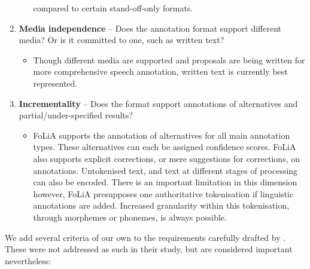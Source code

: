 \documentclass[a4paper,10pt,twoside]{article}
\begin{document}
\begin{enumerate}
\begin{itemize}
      compared to certain stand-off-only formats. 
  \end{itemize}
\item \textbf{Media independence} -- Does the annotation format support
  different media? Or is it committed to one, such as written text?
  \begin{itemize}
    \item[] Though different media are supported and proposals are being written
      for more comprehensive speech annotation, written text is currently best
      represented. 
   \end{itemize}
\item \textbf{Incrementality} -- Does the format support annotations of
  alternatives and partial/under-specified results? 
   \begin{itemize} 
     \item[] FoLiA supports the annotation of alternatives for all
    main annotation types. These alternatives can each be assigned confidence
    scores. FoLiA also supports explicit corrections, or mere suggestions for
    corrections, on annotations.
    Untokenised text, and text at different stages of processing can also be
    encoded. There is an important limitation in this dimension however, FoLiA
    presupposes one authoritative tokenisation if linguistic annotations are
    added. Increased granularity within this tokenisation, through morphemes or
    phonemes, is always possible.
  \end{itemize}
   \setcounter{enumTemp}{\theenumi}
\end{enumerate}

We add several criteria of our own to the requirements carefully drafted by
. These were not addressed as such in their study, but are
considered important nevertheless:
\end{document}
